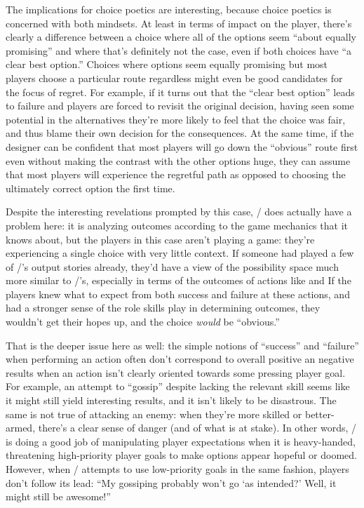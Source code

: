 The implications for choice poetics are interesting, because choice poetics is concerned with both mindsets.
%
At least in terms of impact on the player, there's clearly a difference between a choice where all of the options seem ``about equally promising'' and where that's definitely not the case, even if both choices have ``a clear best option.''
%
Choices where options seem equally promising but most players choose a particular route regardless might even be good candidates for the focus of regret.
%
For example, if it turns out that the ``clear best option'' leads to failure and players are forced to revisit the original decision, having seen some potential in the alternatives they're more likely to feel that the choice was fair, and thus blame their own decision for the consequences.
%
At the same time, if the designer can be confident that most players will go down the ``obvious'' route first even without making the contrast with the other options huge, they can assume that most players will experience the regretful path as opposed to choosing the ultimately correct option the first time.


Despite the interesting revelations prompted by this case, \dunyazad/ does actually have a problem here: it is analyzing outcomes according to the game mechanics that it knows about, but the players in this case aren't playing a game: they're experiencing a single choice with very little context.
%
If someone had played a few of \dunyazad/'s output stories already, they'd have a view of the possibility space much more similar to \dunyazad/'s, especially in terms of the outcomes of actions like  and 
%
If the players knew what to expect from both success and failure at these actions, and had a stronger sense of the role skills play in determining outcomes, they wouldn't get their hopes up, and the choice \emph{would} be ``obvious.''


That is the deeper issue here as well: the simple notions of ``success'' and ``failure'' when performing an action often don't correspond to overall positive an negative results when an action isn't clearly oriented towards some pressing player goal.
%
For example, an attempt to ``gossip'' despite lacking the relevant skill seems like it might still yield interesting results, and it isn't likely to be disastrous.
%
The same is not true of attacking an enemy: when they're more skilled or better-armed, there's a clear sense of danger (and of what is at stake).
%
In other words, \dunyazad/ is doing a good job of manipulating player expectations when it is heavy-handed, threatening high-priority player goals to make options appear hopeful or doomed.
%
However, when \dunyazad/ attempts to use low-priority goals in the same fashion, players don't follow its lead: ``My gossiping probably won't go `as intended?' Well, it might still be awesome!''


